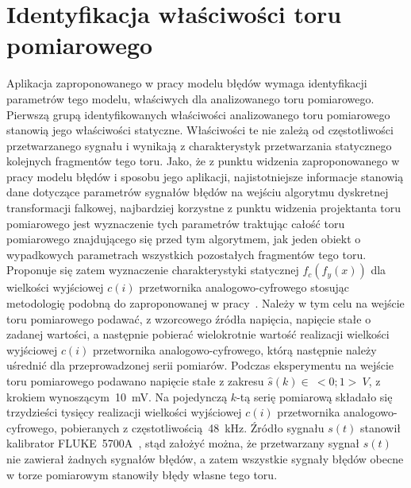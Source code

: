 \section{Identyfikacja właściwości toru pomiarowego}

Aplikacja zaproponowanego w pracy modelu błędów wymaga identyfikacji parametrów tego modelu, właściwych dla analizowanego toru pomiarowego. Pierwszą grupą identyfikowanych właściwości analizowanego toru pomiarowego stanowią jego właściwości statyczne. Właściwości te nie zależą od częstotliwości przetwarzanego sygnału i wynikają z charakterystyk przetwarzania statycznego kolejnych fragmentów tego toru. Jako, że z punktu widzenia zaproponowanego w pracy modelu błędów i sposobu jego aplikacji, najistotniejsze informacje stanowią dane dotyczące parametrów sygnałów błędów na wejściu algorytmu dyskretnej transformacji falkowej, najbardziej korzystne z punktu widzenia projektanta toru pomiarowego jest wyznaczenie tych parametrów traktując całość toru pomiarowego znajdującego się przed tym algorytmem, jak jeden obiekt o wypadkowych parametrach wszystkich pozostałych fragmentów tego toru. Proponuje się zatem wyznaczenie charakterystyki statycznej $f_{c}(f_{y}(x))$ dla wielkości wyjściowej $c(i)$ przetwornika analogowo-cyfrowego stosując metodologię podobną do zaproponowanej w pracy~\cite{kampik_przetworniki}. Należy w tym celu na wejście toru pomiarowego podawać, z wzorcowego źródła napięcia, napięcie stałe o zadanej wartości, a następnie pobierać wielokrotnie wartość realizacji wielkości wyjściowej $c(i)$ przetwornika analogowo-cyfrowego, którą następnie należy uśrednić dla przeprowadzonej serii pomiarów. Podczas eksperymentu na wejście toru pomiarowego podawano napięcie stałe z zakresu $\hat{s}(k) \in~<0;1>~\unit{V}$, z krokiem wynoszącym~\qty{10}{mV}. Na pojedynczą $k$-tą serię pomiarową składało się trzydzieści tysięcy realizacji wielkości wyjściowej $c(i)$ przetwornika analogowo-cyfrowego, pobieranych z częstotliwością~\qty{48}{kHz}. Źródło sygnału $s(t)$ stanowił kalibrator FLUKE~5700A~\cite{fluke_manual}, stąd założyć można, że przetwarzany sygnał $s(t)$ nie zawierał żadnych sygnałów błędów, a zatem wszystkie sygnały błędów obecne w torze pomiarowym stanowiły błędy własne tego toru.


